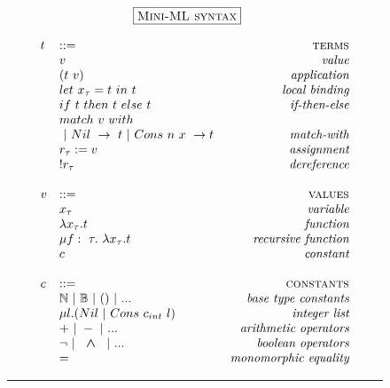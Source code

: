 \documentclass[a4paper,11pt,oneside]{article}
\theoremstyle{plain}
\newcommand{\bwedge}{\boldsymbol{~\wedge~}}
\begin{document}
\begin{figure}[H]
\begin{adjustwidth}{0em}{-3em}
\begin{footnotesize}
\begin{minipage}[t]{0.49\linewidth}
\begin{displaymath}
\begin{array}{llr}
& \hspace*{-0.8cm}\fbox{\textsc{Mini-ML syntax}} 
	
\end{array}
\end{displaymath}
\end{minipage} 
\hspace*{0.7	em} \vrule \hfill 
\begin{minipage}[t]{0.49\linewidth}
\begin{displaymath}
\begin{array}{llr}
	t & ::=										& \textsc{terms}   \\
  	& v 										& \textit {value} \\
  	& (t~v) 								& \textit {application} \\
  	& let~x_{\tau} = t~in~t & \textit {local binding} \\
  	& if~t~then~t~else~t 		& \textit{if-then-else} \\
  	& match~v~with \\
  	& ~|~Nil~->~t~|~Cons~n~x~->t~ 
  													& \textit{match-with}\\
  	& r_{\tau} := v 				& \textit{assignment} \\
  	& !r_{\tau} 						& \textit {dereference} \\
	\\
	v & ::= 											& \textsc{values} \\
  	& x_{\tau}						  		& \textit {variable} \\
		& \lambda x_{\tau} . t 		  & \textit{function} \\
		& \mu f:~\tau.~
			\lambda x_{\tau}. t				& \textit{recursive function} \\
		& c													& \textit{constant}  \\
	\\
  c & ::= 								& \textsc{constants} \\
  	& \mathbb{N}~|~\mathbb{B}~|~() ~|~ ... 
  												& \textit{base type constants} \\
  	& \mu l. (Nil ~|~ Cons~c_{int}~l)   
  												& \textit{integer list}  \\ 
  	& + ~|~ - ~|~ ... 		
  												& \textit{arithmetic operators} \\
  	& \neg ~|~ \bwedge ~|~ ... 
  												& \textit{boolean operators} \\
 		& = 
 													& \textit{monomorphic equality} \\
\end{array}
\end{displaymath}
\end{minipage} 	 		 
\end{footnotesize}
\end{adjustwidth}
\label{mini-ml-def-syn}
\hrule
\end{figure} 
\end{document}
